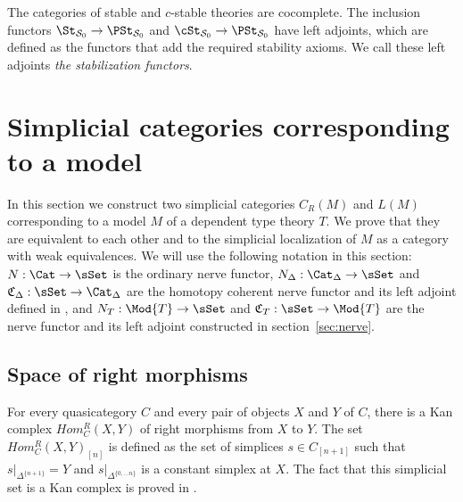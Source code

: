 The categories of stable and $c$-stable theories are cocomplete.
The inclusion functors $\St_{\mathcal{S}_0} \to \PSt_{\mathcal{S}_0}$ and $\cSt_{\mathcal{S}_0} \to \PSt_{\mathcal{S}_0}$ have left adjoints,
which are defined as the functors that add the required stability axioms.
We call these left adjoints \emph{the stabilization functors}.


\section{Simplicial categories corresponding to a model}

In this section we construct two simplicial categories $C_R(M)$ and $L(M)$ corresponding to a model $M$ of a dependent type theory $T$.
We prove that they are equivalent to each other and to the simplicial localization of $M$ as a category with weak equivalences.
We will use the following notation in this section: $N : \Cat \to \sSet$ is the ordinary nerve functor,
$N_\Delta : \Cat_\Delta \to \sSet$ and $\mathfrak{C}_\Delta : \sSet \to \Cat_\Delta$ are the homotopy coherent nerve functor and its left adjoint defined in \cite{lurie-topos},
and $N_T : \Mod{T} \to \sSet$ and $\mathfrak{C}_T : \sSet \to \Mod{T}$ are the nerve functor and its left adjoint constructed in section~\ref{sec:nerve}.

\subsection{Space of right morphisms}

For every quasicategory $C$ and every pair of objects $X$ and $Y$ of $C$, there is a Kan complex $Hom^R_C(X,Y)$ of right morphisms from $X$ to $Y$.
The set $Hom^R_C(X,Y)_{[n]}$ is defined as the set of simplices $s \in C_{[n+1]}$ such that $s|_{\Delta^{\{n+1\}}} = Y$ and $s|_{\Delta^{\{0, \ldots n\}}}$ is a constant simplex at $X$.
The fact that this simplicial set is a Kan complex is proved in \cite[Proposition~1.2.2.3]{lurie-topos}.

